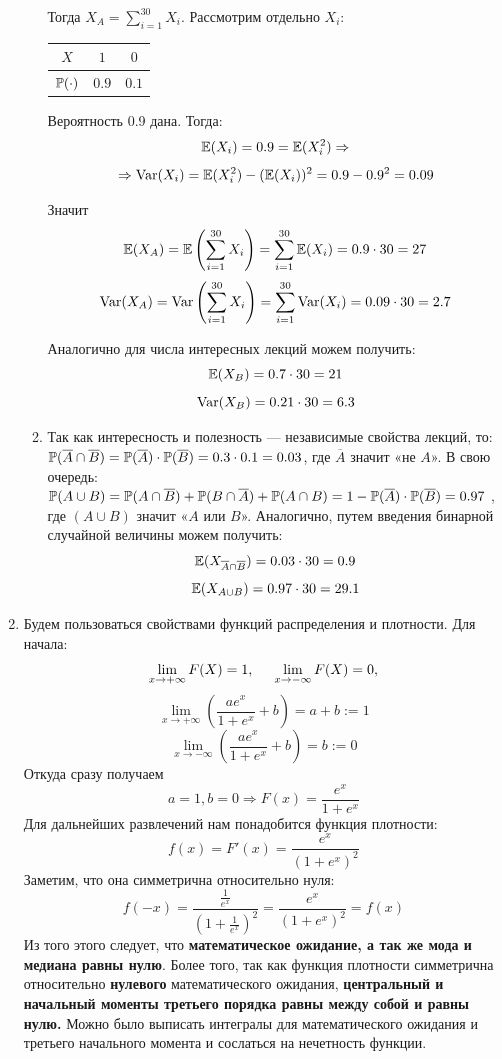 \documentclass[12pt, a4paper]{article}\usepackage[]{graphicx}\usepackage[]{color}
\begin{document}
\begin{enumerate}
\begin{enumerate}
Тогда $X_A = \sum\limits_{i=1}^{30}X_i$. Рассмотрим отдельно $X_i$:

\begin{tabular}{@{}ccc@{}}
\toprule
$X$         & $1$             & $0$               \\ \midrule
$\P(\cdot)$ & $0.9$ & $0.1$ \\ \bottomrule
\end{tabular}

Вероятность 0.9 дана. Тогда:
\[
\E(X_i) = 0.9 = \E(X^2_i) \Rightarrow
\]
\[
\Rightarrow \Var(X_i) = \E(X^2_i) - (\E(X_i))^2 = 0.9 - 0.9^2 = 0.09
\]

Значит
\[
\E(X_A) = \E\left(\sum\limits_{i=1}^{30}X_i\right) = \sum\limits_{i=1}^{30}\E(X_i)  = 0.9\cdot30 = 27
\]
\[
\Var(X_A) = \Var\left(\sum\limits_{i=1}^{30}X_i\right) = \sum\limits_{i=1}^{30}\Var(X_i) = 0.09\cdot30 = 2.7
\]

Аналогично для числа интересных лекций можем получить:
\[
\E(X_B) = 0.7\cdot 30 = 21
\]
\[
\Var(X_B) = 0.21\cdot 30 = 6.3
\]


\item Так как интересность и полезность — независимые свойства лекций, то:\\
 $\P(\overline{A} \cap \overline{B}) = \P(\overline{A})\cdot \P(\overline{B}) = 0.3\cdot0.1 = 0.03$, где $\overline{A}$ значит «не $A$». В свою очередь:\\
 $\P(A\cup B) = \P(A\cap\overline{B}) + \P(B\cap\overline{A}) + \P(A\cap B) = 1 - \P(\overline{A})\cdot \P(\overline{B}) = 0.97$ , где $(A\cup B)$ значит «$A$  или $B$». Аналогично, путем введения бинарной случайной величины можем получить:
 \[
 \E(X_{\overline{A} \cap \overline{B}}) = 0.03 \cdot  30 = 0.9
 \]
 \[
 \E(X_{A\cup B}) = 0.97\cdot30 = 29.1
\]
\end{enumerate}

\item
Будем пользоваться свойствами функций распределения и плотности. Для начала:
\[
\lim\limits_{x \rightarrow +\infty} F(X) = 1, \hspace{0.5cm} \lim\limits_{x \rightarrow -\infty} F(X) = 0,
\]
\[
\lim\limits_{x \rightarrow +\infty} \left(\frac{ae^x}{1+e^x}+b\right) = a+b := 1
\]
\[
\lim\limits_{x \rightarrow -\infty} \left(\frac{ae^x}{1+e^x}+b\right) = b :=0
\]
Откуда сразу получаем \[a =1, b = 0 \Rightarrow F(x) = \frac{e^x}{1+e^x}\]
Для дальнейших развлечений нам понадобится функция плотности:
\[
f(x) = F'(x) = \frac{e^x}{(1+e^x)^2}
\]
 Заметим, что она симметрична относительно нуля:
 \[
 f(-x) = \frac{\frac{1}{e^x}}{\left(1+\frac{1}{e^x}\right)^2} = \frac{e^x}{(1+e^x)^2} = f(x)
 \]
 Из того этого следует, что \textbf{математическое ожидание, а так же мода и медиана равны нулю}. Более того, так как функция плотности симметрична относительно \textbf{нулевого} математического ожидания, \textbf{центральный и начальный моменты третьего порядка равны между собой и равны нулю.} Можно было выписать интегралы для математического ожидания и третьего начального момента и сослаться на нечетность функции.






\end{enumerate}
\end{document}
